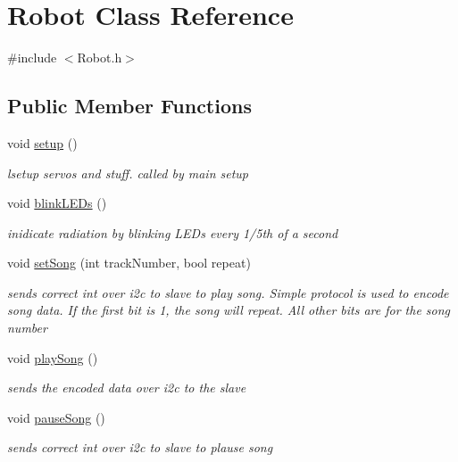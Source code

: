 \hypertarget{classRobot}{\section{Robot Class Reference}
\label{classRobot}
}


{\ttfamily \#include $<$Robot.\-h$>$}

\subsection*{Public Member Functions}
\begin{DoxyCompactItemize}
\item 
void \hyperlink{classRobot_a1fc37e3c329d59795f6adf44199d4df9}{setup} ()
\begin{DoxyCompactList}\small\item\em lsetup servos and stuff. called by main setup \end{DoxyCompactList}\item 
void \hyperlink{classRobot_a4215f7e880311c2118f387df75effaf2}{blink\-L\-E\-Ds} ()
\begin{DoxyCompactList}\small\item\em inidicate radiation by blinking L\-E\-Ds every 1/5th of a second \end{DoxyCompactList}\item 
void \hyperlink{classRobot_a87e94e8db5092976d1125c674cf2b519}{set\-Song} (int track\-Number, bool repeat)
\begin{DoxyCompactList}\small\item\em sends correct int over i2c to slave to play song. Simple protocol is used to encode song data. If the first bit is 1, the song will repeat. All other bits are for the song number \end{DoxyCompactList}\item 
void \hyperlink{classRobot_ad86dbbb2ad0d065f3e4c30fd4b742e1c}{play\-Song} ()
\begin{DoxyCompactList}\small\item\em sends the encoded data over i2c to the slave \end{DoxyCompactList}\item 
void \hyperlink{classRobot_a7c4cf197187f9f7dcb883ebc58f52b93}{pause\-Song} ()
\begin{DoxyCompactList}\small\item\em sends correct int over i2c to slave to plause song \end{DoxyCompactList}\item 

\end{DoxyCompactItemize}
